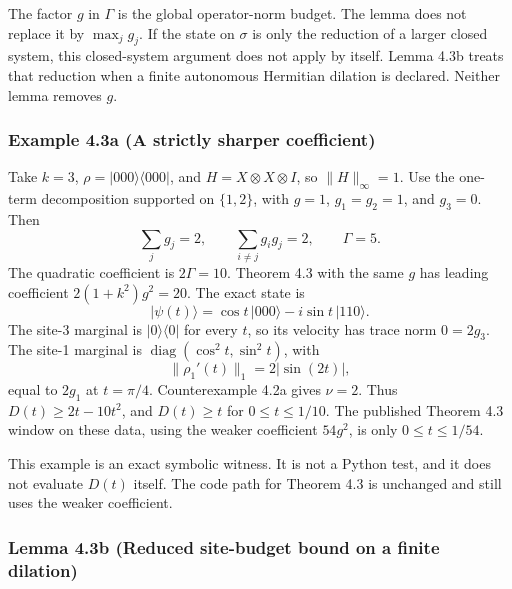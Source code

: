 \documentclass[
  11pt,
]{article}
\begin{document}
The factor \(g\) in \(\Gamma\) is the global operator-norm budget. The
lemma does not replace it by \(\max_j g_j\). If the state on \(\sigma\)
is only the reduction of a larger closed system, this closed-system
argument does not apply by itself. Lemma 4.3b treats that reduction
when a finite autonomous Hermitian dilation is declared. Neither lemma removes
\(g\).

\subsubsection{Example 4.3a (A strictly sharper coefficient)}\label{example-4.3a-a-strictly-sharper-coefficient}

Take \(k=3\), \(\rho=|000\rangle\langle000|\), and
\(H=X\otimes X\otimes I\), so \(\|H\|_\infty=1\). Use the one-term
decomposition supported on \(\{1,2\}\), with \(g=1\), \(g_1=g_2=1\),
and \(g_3=0\). Then
\[
\sum_j g_j=2,\qquad
\sum_{i\ne j}g_ig_j=2,\qquad
\Gamma=5.
\]
The quadratic coefficient is \(2\Gamma=10\). Theorem 4.3 with the same
\(g\) has leading coefficient \(2(1+k^2)g^2=20\). The exact state is
\[
|\psi(t)\rangle=\cos t\,|000\rangle-i\sin t\,|110\rangle.
\]
The site-3 marginal is \(|0\rangle\langle0|\) for every \(t\), so its
velocity has trace norm \(0=2g_3\). The site-1 marginal is
\(\operatorname{diag}(\cos^2 t,\sin^2 t)\), with
\[
\|\rho_1'(t)\|_1=2|\sin(2t)|,
\]
equal to \(2g_1\) at \(t=\pi/4\). Counterexample 4.2a gives \(\nu=2\).
Thus \(D(t)\ge2t-10t^2\), and \(D(t)\ge t\) for \(0\le t\le1/10\).
The published Theorem 4.3 window on these data, using the weaker
coefficient \(54g^2\), is only \(0\le t\le1/54\).

This example is an exact symbolic witness. It is not a Python test, and
it does not evaluate \(D(t)\) itself. The code path for Theorem 4.3 is
unchanged and still uses the weaker coefficient.

\subsubsection{Lemma 4.3b (Reduced site-budget bound on a finite dilation)}\label{lemma-4.3b-reduced-site-budget-bound-on-a-finite-dilation}
\end{document}
